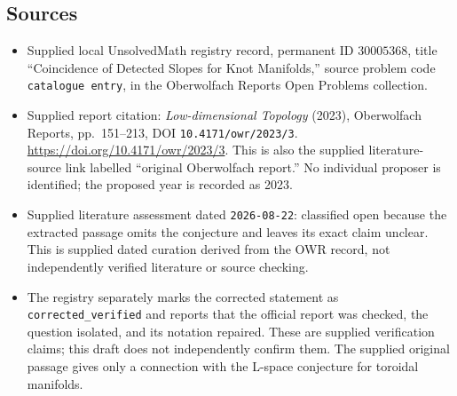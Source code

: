 \documentclass[11pt]{article}
\begin{document}
\subsection{Sources}
\begin{itemize}
\item Supplied local UnsolvedMath registry record, permanent ID \(30005368\), title ``Coincidence of Detected Slopes for Knot Manifolds,'' source problem code \texttt{catalogue entry}, in the Oberwolfach Reports Open Problems collection.
\item Supplied report citation: \emph{Low-dimensional Topology} (2023), Oberwolfach Reports, pp.\ 151--213, DOI \texttt{10.4171/owr/2023/3}. \url{https://doi.org/10.4171/owr/2023/3}. This is also the supplied literature-source link labelled ``original Oberwolfach report.'' No individual proposer is identified; the proposed year is recorded as 2023.
\item Supplied literature assessment dated \texttt{2026-08-22}: classified open because the extracted passage omits the conjecture and leaves its exact claim unclear. This is supplied dated curation derived from the OWR record, not independently verified literature or source checking.
\item The registry separately marks the corrected statement as \texttt{corrected\_verified} and reports that the official report was checked, the question isolated, and its notation repaired. These are supplied verification claims; this draft does not independently confirm them. The supplied original passage gives only a connection with the L-space conjecture for toroidal manifolds.
\end{itemize}
\end{document}
